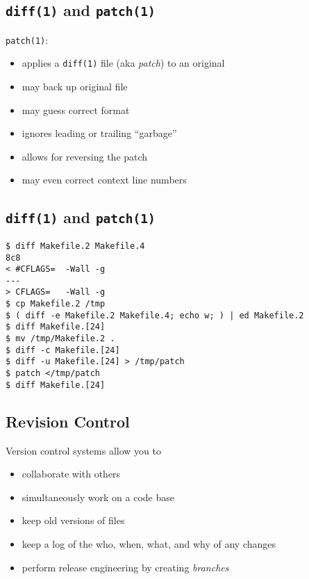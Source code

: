 \documentclass[xga]{xdvislides}
\begin{document}
\subsection{{\tt diff(1)} and {\tt patch(1)}}
{\tt patch(1)}:
\begin{itemize}
	\item applies a {\tt diff(1)} file (aka {\em patch}) to an original
	\item may back up original file
	\item may guess correct format
	\item ignores leading or trailing ``garbage''
	\item allows for reversing the patch
	\item may even correct context line numbers
\end{itemize}

\subsection{{\tt diff(1)} and {\tt patch(1)}}
\begin{verbatim}
$ diff Makefile.2 Makefile.4
8c8
< #CFLAGS=	-Wall -g
---
> CFLAGS=	-Wall -g
$ cp Makefile.2 /tmp
$ ( diff -e Makefile.2 Makefile.4; echo w; ) | ed Makefile.2
$ diff Makefile.[24]
$ mv /tmp/Makefile.2 .
$ diff -c Makefile.[24]
$ diff -u Makefile.[24] > /tmp/patch
$ patch </tmp/patch
$ diff Makefile.[24]
\end{verbatim}

\subsection{Revision Control}
Version control systems allow you to

\begin{itemize}
	\item collaborate with others
	\item simultaneously work on a code base
	\item keep old versions of files
	\item keep a log of the who, when, what, and why of any changes
	\item perform release engineering by creating {\em branches}
\end{itemize}
\end{document}
